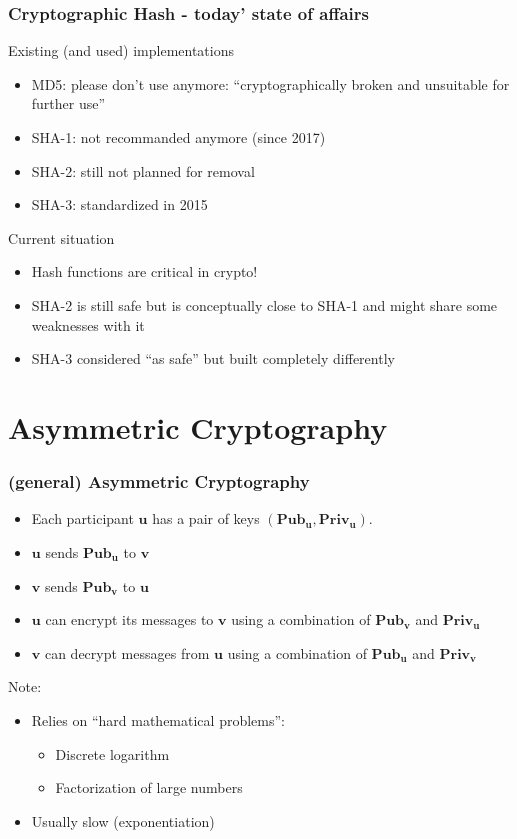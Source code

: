 \documentclass[
hyperref={pdfpagelabels=false}
,xcolor=table
]
{beamer}
\begin{document}
\begin{frame}
  \frametitle{Cryptographic Hash - today' state of affairs}

  \begin{block}{Existing (and used) implementations}
    \begin{itemize}
    \item MD5: please don't use anymore: ``cryptographically broken and
      unsuitable for further use''
    \item SHA-1: not recommanded anymore (since 2017)
    \item SHA-2: still not planned for removal
    \item SHA-3: standardized in 2015
    \end{itemize}
  \end{block}
  
  \begin{block}{Current situation}
    \begin{itemize}
    \item Hash functions are critical in crypto!
    \item SHA-2 is still safe but is conceptually close to SHA-1 and might share some weaknesses with it
    \item SHA-3 considered ``as safe'' but built completely differently
    \end{itemize}
  \end{block}
\end{frame}

\section{Asymmetric Cryptography}



\begin{frame}
  \frametitle{(general) Asymmetric Cryptography}

  \begin{itemize}
  \item Each participant $\bm{u}$ has a pair of keys $\bm{(Pub_u,Priv_u)}$. 
  \item $\bm{u}$ sends $\bm{Pub_u}$ to $\bm{v}$
  \item $\bm{v}$ sends $\bm{Pub_v}$ to $\bm{u}$
  \item $\bm{u}$ can encrypt its messages to $\bm{v}$ using a combination of $\bm{Pub_v}$ and $\bm{Priv_u}$
  \item $\bm{v}$ can decrypt messages from $\bm{u}$ using a combination  of $\bm{Pub_u}$ and $\bm{Priv_v}$
  \end{itemize}

  Note:
  \begin{itemize}
  \item Relies on ``hard mathematical problems'':
    \begin{itemize}
    \item Discrete logarithm
    \item Factorization of large numbers
    \end{itemize}
  \item Usually slow (exponentiation)
  \end{itemize}
\end{frame}
\end{document}
